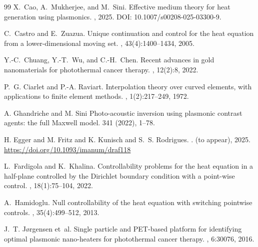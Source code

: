 \documentclass[11pt,a4paper]{article}
\numberwithin{equation}{section}
\theoremstyle{definition}
\newcommand{\1}{\mathbbm{1}}
\begin{document}
\begin{thebibliography}{99}
X.~Cao, A.~Mukherjee, and M.~Sini.
\newblock Effective medium theory for heat generation using plasmonics.
, 2025.
\newblock DOI: 10.1007/s00208-025-03300-9.

C.~Castro and E.~Zuazua.
\newblock Unique continuation and control for the heat equation from a lower-dimensional moving set.
, 43(4):1400--1434, 2005.

Y.-C.~Chuang, Y.-T.~Wu, and C.-H.~Chen.
\newblock Recent advances in gold nanomaterials for photothermal cancer therapy.
, 12(2):8, 2022.


P.~G. Ciarlet and P.-A. Raviart.
\newblock Interpolation theory over curved elements, with applications to finite element methods.
, 1(2):217--249, 1972.


A. Ghandriche and M. Sini
\newblock Photo-acoustic inversion using plasmonic contrast agents: the full Maxwell model.
 341 (2022), 1–78.


H. Egger and M. Fritz and K. Kunisch and S.~S. Rodrigues.
.
 (to appear), 2025. \url{https://doi.org/10.1093/imanum/draf118}



L.~Fardigola and K.~Khalina.
\newblock Controllability problems for the heat equation in a half-plane controlled by the Dirichlet boundary condition with a point-wise control.
, 18(1):75--104, 2022.

A.~Hamidoglu.
\newblock Null controllability of the heat equation with switching pointwise controls.
, 35(4):499--512, 2013.

J.~T. J{\o}rgensen et~al.
\newblock Single particle and {PET}-based platform for identifying optimal plasmonic nano-heaters for photothermal cancer therapy.
, 6:30076, 2016.


\end{thebibliography}
\end{document}
